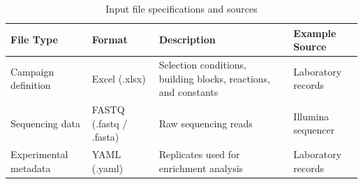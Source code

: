 \begin{table}[htbp]
\centering
\caption{Input file specifications and sources}
\label{tab:table1}
\begin{tabular}{p{3.2cm}p{3.0cm}p{5.8cm}p{2.5cm}}
\toprule
File Type & Format & Description & Example Source \\
\midrule
Campaign definition & Excel (.xlsx) & Selection conditions, building blocks, reactions, and constants & Laboratory records \\
Sequencing data & FASTQ (.fastq / .fasta) & Raw sequencing reads & Illumina sequencer \\
Experimental metadata & YAML (.yaml) & Replicates used for enrichment analysis & Laboratory records \\
\bottomrule
\end{tabular}
\end{table}
